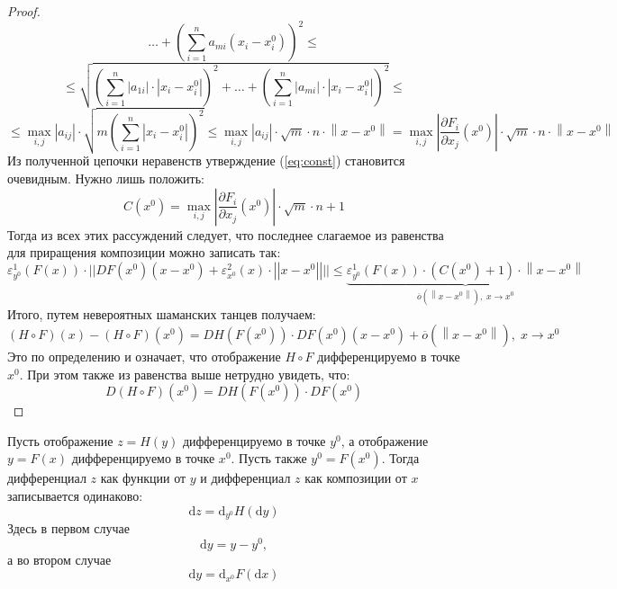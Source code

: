 \documentclass[11pt]{article}
\begin{document}
\begin{proof}
\[{    \dots + \left(\displaystyle \sum_{i = 1}^{n}a_{mi} \left(x_i - x^0_i\right)\right)^2} \leq\]
    \[\leq \sqrt{\left(\displaystyle \sum_{i = 1}^{n}\left|a_{1i}\right| \cdot \left\lvert x_i - x^0_i \right\rvert \right)^2 + 
    \dots + \left(\displaystyle \sum_{i = 1}^{n}\left|a_{mi}\right| \cdot \left\lvert x_i - x^0_i \right\rvert \right)^2} \leq
    \]
    \[\leq \max_{i, j}\left|a_{ij}\right|\cdot\sqrt{m\left(\sum\limits_{i=1}^n\left|x_i-x_i^0\right|\right)^2}
    \leq \max_{i, j}\left|a_{ij}\right|\cdot\sqrt{m}\cdot n \cdot \left\lVert x - x^0 \right\rVert = \max_{i, j}\left|\frac{\partial F_i}{\partial x_j} \left(x^0\right)\right| \cdot \sqrt{m} \cdot n \cdot \left\lVert x - x^0 \right\rVert\]
    Из полученной цепочки неравенств утверждение (\ref{eq:const}) становится очевидным. Нужно лишь положить:
    \[ C\left(x^0\right) = \max_{i, j}\left|\frac{\partial F_i}{\partial x_j} \left(x^0\right)\right| \cdot \sqrt{m} \cdot n + 1\]
    Тогда из всех этих рассуждений следует, что последнее слагаемое из равенства для приращения композиции можно записать так:
    \[\varepsilon_{y^0}^1(F(x)) \cdot \bigg|\bigg|DF\left(x^0\right)\left(x - x^0\right) + 
    \varepsilon_{x^0}^2(x) \cdot \left|\left|x - x^0\right|\right|\bigg|\bigg| \leq \underbrace{\varepsilon_{y^0}^1(F(x)) \cdot \left(C\left(x^0\right) + 1\right) \cdot \left\lVert x - x^0 \right\rVert}_{\overline{o}\left( \left\lVert x - x^0 \right\rVert  \right), \; x \to x^0}\]
    Итого, путем невероятных шаманских танцев получаем:
    \[\left(H \circ F\right)\left(x\right) - \left(H \circ F\right)\left(x^0\right) = DH\left(F\left(x^0\right)\right) \cdot DF\left(x^0\right)\left(x - x^0\right)
    + \overline{o}\left( \left\lVert x - x^0 \right\rVert \right), \; x \to x^0\]
    Это по определению и означает, что отображение $H \circ F$ дифференцируемо в точке $x^0$. При этом также из равенства выше нетрудно увидеть, что:
    \[D\left(H \circ F\right)\left(x^0\right) = DH\left(F\left(x^0\right)\right) \cdot DF\left(x^0\right)\]
\end{proof}

\begin{consequence}
    Пусть отображение $z = H(y)$ дифференцируемо в точке $y^0$, а отображение $y = F(x)$
    дифференцируемо в точке $x^0$. Пусть также  $y^0 = F(x^0)$. Тогда дифференциал $z$ как 
    функции от $y$ и дифференциал $z$ как композиции от $x$ записывается одинаково:
    \[\mathrm d z = \mathrm d_{y^0}H (\mathrm d y)\]
    Здесь в первом случае \[\mathrm dy = y - y^0,\] а во втором случае \[\mathrm dy = \mathrm d_{x^0}F (\mathrm dx)\]
\end{consequence}
\end{document}
